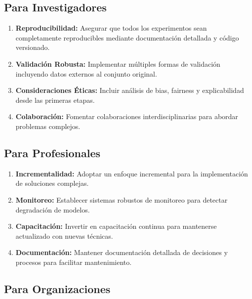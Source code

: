 \subsection{Para Investigadores}

\begin{enumerate}
    \item \textbf{Reproducibilidad:} Asegurar que todos los experimentos sean completamente reproducibles mediante documentación detallada y código versionado.
    
    \item \textbf{Validación Robusta:} Implementar múltiples formas de validación incluyendo datos externos al conjunto original.
    
    \item \textbf{Consideraciones Éticas:} Incluir análisis de bias, fairness y explicabilidad desde las primeras etapas.
    
    \item \textbf{Colaboración:} Fomentar colaboraciones interdisciplinarias para abordar problemas complejos.
\end{enumerate}

\subsection{Para Profesionales}

\begin{enumerate}
    \item \textbf{Incrementalidad:} Adoptar un enfoque incremental para la implementación de soluciones complejas.
    
    \item \textbf{Monitoreo:} Establecer sistemas robustos de monitoreo para detectar degradación de modelos.
    
    \item \textbf{Capacitación:} Invertir en capacitación continua para mantenerse actualizado con nuevas técnicas.
    
    \item \textbf{Documentación:} Mantener documentación detallada de decisiones y procesos para facilitar mantenimiento.
\end{enumerate}

\subsection{Para Organizaciones}

